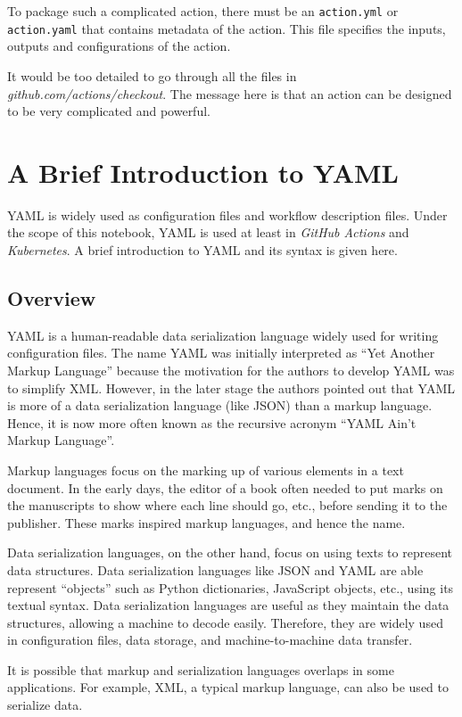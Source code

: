 To package such a complicated action, there must be an \verb|action.yml| or \verb|action.yaml| that contains metadata of the action. This file specifies the inputs, outputs and configurations of the action.

It would be too detailed to go through all the files in \textit{github.com/actions/checkout}. The message here is that an action can be designed to be very complicated and powerful.

\chapter{A Brief Introduction to YAML} \label{ch:yaml}

YAML is widely used as configuration files and workflow description files. Under the scope of this notebook, YAML is used at least in \textit{GitHub Actions} and \textit{Kubernetes}. A brief introduction to YAML and its syntax is given here.

\section{Overview}

YAML is a human-readable data serialization language widely used for writing configuration files. The name YAML was initially interpreted as ``Yet Another Markup Language'' because the motivation for the authors to develop YAML was to simplify XML. However, in the later stage the authors pointed out that YAML is more of a data serialization language (like JSON) than a markup language. Hence, it is now more often known as the recursive acronym ``YAML Ain't Markup Language''.

\begin{mdframed}

Markup languages focus on the marking up of various elements in a text document. In the early days, the editor of a book often needed to put marks on the manuscripts to show where each line should go, etc., before sending it to the publisher. These marks inspired markup languages, and hence the name.

Data serialization languages, on the other hand, focus on using texts to represent data structures. Data serialization languages like JSON and YAML are able represent ``objects'' such as Python dictionaries, JavaScript objects, etc., using its textual syntax. Data serialization languages are useful as they maintain the data structures, allowing a machine to decode easily. Therefore, they are widely used in configuration files, data storage, and machine-to-machine data transfer.

It is possible that markup and serialization languages overlaps in some applications. For example, XML, a typical markup language, can also be used to serialize data.

\end{mdframed}

